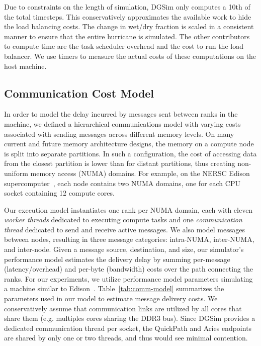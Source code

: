 Due to constraints on the length of simulation, DGSim only computes a 10th of the total timesteps. This conservatively approximates the available work to hide the load balancing costs. The change in wet/dry fraction is scaled in a consistent manner to ensure that the entire hurricane is simulated.
The other contributors to compute time are the task scheduler overhead and the cost to run the load balancer.
We use timers to measure the actual costs of these computations on the host machine.

\subsection{Communication Cost Model}

In order to model the delay incurred by messages sent between ranks in
the machine, we defined a hierarchical communications model with varying
costs associated with sending messages across different memory levels.
On many current and future memory architecture designs, the memory on
a compute node is split into separate partitions.
In such a configuration, the cost of accessing data from the closest
partition is lower than for distant partitions, thus
creating non-uniform memory access (NUMA) domains.
For example, on the NERSC Edison supercomputer~\cite{Edison},
each node contains two NUMA domains, one for each CPU socket containing
12 compute cores.

Our execution model instantiates one rank per NUMA domain, each with
eleven {\it worker threads} dedicated to executing compute tasks and one
{\it communication thread} dedicated to send and receive active messages.
We also model messages between nodes, resulting in three message categories:
intra-NUMA, inter-NUMA, and inter-node.
Given a message source, destination, and size,
our simulator's performance model estimates the delivery delay by
summing per-message (latency/overhead) and per-byte
(bandwidth) costs over the path connecting the ranks.
For our experiments, we utilize performance model parameters simulating
a machine similar to Edison~\cite{Edison}.
Table~\ref{tab:comm-model} summarizes the parameters used in our
model to estimate message delivery costs.
We conservatively assume that communication links are utilized
by all cores that share them (e.g. multiples cores sharing the DDR3 bus).
Since DGSim provides a dedicated communication thread per socket,
the QuickPath and Aries endpoints are shared by only one or two
threads, and thus would see minimal contention.

